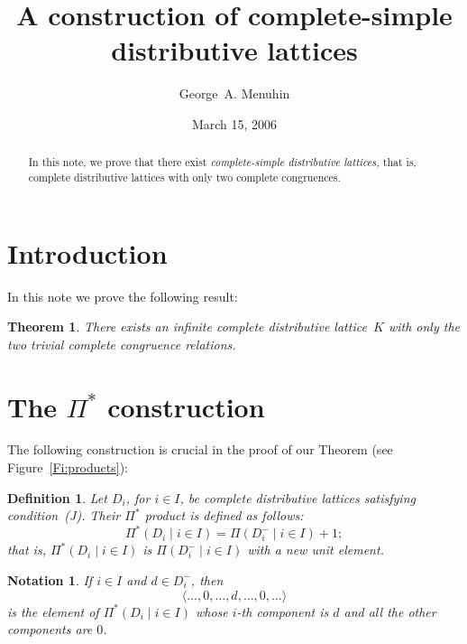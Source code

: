 \documentclass{amsart}
\newtheorem{theorem}{Theorem}
\newtheorem{definition}{Definition}
\newtheorem{notation}{Notation}
\begin{document}
\title{A construction of complete-simple\\  
       distributive lattices}
\author{George~A. Menuhin}
\address{Computer Science Department\\
         University of Winnebago\\
         Winnebago, MN 53714} 
\date{March 15, 2006}
 
\begin{abstract}
   In this note, we prove that there exist 
   \emph{complete-simple distributive lattices,} 
   that is, complete distributive lattices
  with only two complete congruences. 
\end{abstract}

\maketitle

\section{Introduction}\label{S:intro}
In this note we prove the following result:

\begin{theorem} 
There exists an infinite complete distributive 
lattice~$K$ with only the two trivial complete 
congruence relations.
\end{theorem}

\section{The $\Pi^{*}$ construction}\label{S:P*} 
%
%
The following construction is crucial in the proof
of our Theorem (see Figure~\ref{Fi:products}):

\begin{definition}\label{D:P*} 
Let $D_{i}$, for $i \in I$, be complete distributive 
lattices satisfying condition~\textup{(J)}.  Their 
$\Pi^{*}$ product is defined as follows:
\[
   \Pi^{*} ( D_{i} \mid i \in I ) = 
   \Pi ( D_{i}^{-} \mid i \in I ) + 1;
\]
that is, $\Pi^{*} ( D_{i} \mid i \in I )$ is 
$\Pi ( D_{i}^{-} \mid i \in I )$ with a new 
unit element. 
\end{definition}

\begin{notation}  
If $i \in I$ and $d \in D_{i}^{-}$, then
\[
  \langle \dots, 0, \dots, d, \dots, 0, \dots \rangle
\]
is the element of $\Pi^{*} ( D_{i} \mid i \in I )$ whose 
$i$-th component is $d$ and all the other components 
are $0$.
\end{notation}
\end{document}

